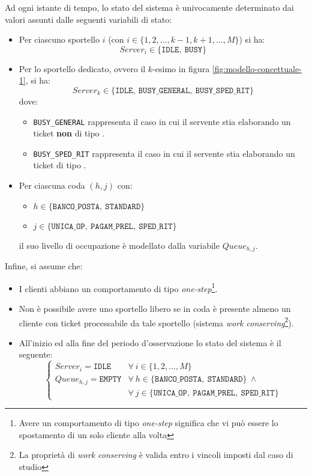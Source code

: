 Ad ogni istante di tempo, lo stato del sistema è univocamente determinato dai valori assunti dalle seguenti variabili di stato:
\begin{itemize}
\item Per ciascuno sportello $i$ (con $i \in \lbrace 1, 2, \dots, k-1, k+1, \dots, M \rbrace$) si ha:
\begin{equation}
Server_i \in \lbrace \mathtt{IDLE},\ \mathtt{BUSY} \rbrace 
\end{equation}
\item Per lo sportello dedicato, ovvero il $k$-esimo in figura \ref{fig:modello-concettuale-1}, si ha:
\begin{equation}
Server_k \in \lbrace \mathtt{IDLE},\ \mathtt{BUSY\_GENERAL},\ \mathtt{BUSY\_SPED\_RIT}\rbrace 
\end{equation}
dove:
\begin{itemize}
\item \texttt{BUSY\_GENERAL} rappresenta il caso in cui il servente stia elaborando un ticket \textbf{non} di tipo \sr{}.
\item \texttt{BUSY\_SPED\_RIT} rappresenta il caso in cui il servente stia elaborando un ticket di tipo \sr{}.
\end{itemize}
\item Per ciascuna coda $(h, j)$ con:
\begin{itemize}
\item $h \in \lbrace \mathtt{BANCO\_POSTA},\ \mathtt{STANDARD}\rbrace$
\item $j \in \lbrace \mathtt{UNICA\_OP},\ \mathtt{PAGAM\_PREL},\ \mathtt{SPED\_RIT} \rbrace$
\end{itemize}
il suo livello di occupazione è modellato dalla variabile $Queue_{h,j}$.
\end{itemize}

Infine, si assume che:
\begin{itemize}
\item I clienti abbiano un comportamento di tipo \textsl{one-step}\footnote{Avere un comportamento di tipo \textsl{one-step} significa che vi può essere lo spostamento di un solo cliente alla volta}.
\item Non è possibile avere uno sportello libero se in coda è presente almeno un cliente con ticket processabile da tale sportello (sistema \textsl{work conserving}\footnote{La proprietà di \textsl{work conserving} è valida entro i vincoli imposti dal caso di studio}).
\item All'inizio ed alla fine del periodo d'osservazione lo stato del sistema è il seguente:
\begin{equation}
\begin{cases}
Server_i =\mathtt{IDLE} & \forall\ i \in \lbrace 1, 2, \dots, M \rbrace \\[1em]
Queue_{h,j} = \mathtt{EMPTY} & \forall\ h \in \lbrace \mathtt{BANCO\_POSTA},\ \mathtt{STANDARD}\rbrace\ \wedge \\
& \forall\ j \in \lbrace \mathtt{UNICA\_OP},\ \mathtt{PAGAM\_PREL},\ \mathtt{SPED\_RIT} \rbrace
\end{cases}
\end{equation}
\end{itemize}


